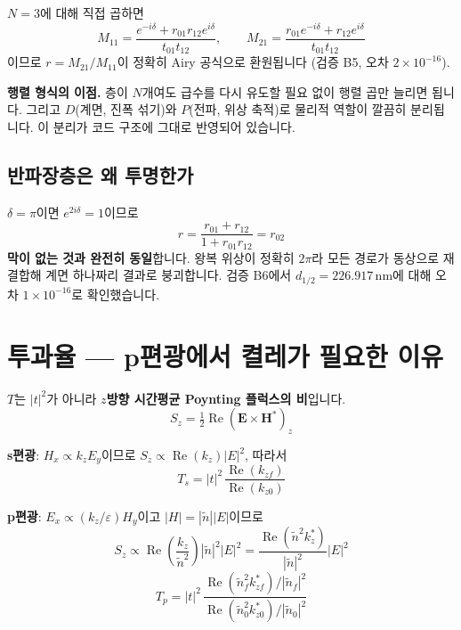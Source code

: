 \documentclass[10pt,a4paper]{article}
\newcommand{\note}[1]{%
  \begin{tcolorbox}[enhanced,breakable,colback=white,colframe=accent,
    boxrule=0pt,leftrule=1.6pt,arc=0pt,outer arc=0pt,
    left=6pt,right=2pt,top=3pt,bottom=3pt,boxsep=0pt,
    before skip=5pt, after skip=8pt]
  #1
  \end{tcolorbox}}
\newcommand{\nt}{\tilde n}
\newcommand{\Real}{\operatorname{Re}}
\begin{document}
$N=3$에 대해 직접 곱하면
\begin{equation}
M_{11}=\frac{e^{-i\delta}+r_{01}r_{12}e^{i\delta}}{t_{01}t_{12}},\qquad
M_{21}=\frac{r_{01}e^{-i\delta}+r_{12}e^{i\delta}}{t_{01}t_{12}}
\end{equation}
이므로 $r=M_{21}/M_{11}$이 정확히 Airy 공식으로 환원됩니다 (검증 B5, 오차 $2\times10^{-16}$).

\note{\textbf{행렬 형식의 이점.} 층이 $N$개여도 급수를 다시 유도할 필요 없이 행렬 곱만 늘리면 됩니다. 그리고 $D$(계면, 진폭 섞기)와 $P$(전파, 위상 축적)로 물리적 역할이 깔끔히 분리됩니다. 이 분리가 코드 구조에 그대로 반영되어 있습니다.}

\subsection{반파장층은 왜 투명한가}

$\delta=\pi$이면 $e^{2i\delta}=1$이므로
\begin{equation}
r = \frac{r_{01}+r_{12}}{1+r_{01}r_{12}} = r_{02}
\end{equation}
\textbf{막이 없는 것과 완전히 동일}합니다. 왕복 위상이 정확히 $2\pi$라 모든 경로가 동상으로 재결합해 계면 하나짜리 결과로 붕괴합니다. 검증 B6에서 $d_{1/2}=226.917$\,nm에 대해 오차 $1\times10^{-16}$로 확인했습니다.

\section{투과율 — p편광에서 켤레가 필요한 이유}

$T$는 $|t|^2$가 아니라 \textbf{$z$방향 시간평균 Poynting 플럭스의 비}입니다.
\begin{equation}
S_z = \tfrac12\Real(\mathbf{E}\times\mathbf{H}^*)_z
\end{equation}

\textbf{s편광}: $H_x\propto k_z E_y$이므로 $S_z\propto\Real(k_z)|E|^2$, 따라서
\begin{equation}
T_s = |t|^2\,\frac{\Real(k_{zf})}{\Real(k_{z0})}
\end{equation}

\textbf{p편광}: $E_x\propto(k_z/\varepsilon)H_y$이고 $|H|=|\nt||E|$이므로
\begin{equation}
S_z \propto \Real\!\left(\frac{k_z}{\nt^2}\right)|\nt|^2|E|^2
= \frac{\Real(\nt^2k_z^*)}{|\nt|^2}|E|^2
\end{equation}
\begin{equation}
T_p = |t|^2\,\frac{\Real(\nt_f^2k_{zf}^*)/|\nt_f|^2}{\Real(\nt_0^2k_{z0}^*)/|\nt_0|^2}
\end{equation}
\end{document}
